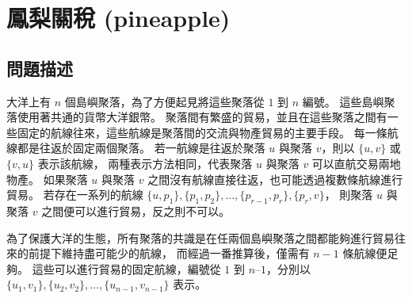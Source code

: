 \section{鳳梨關稅 (pineapple)}

\subsection{問題描述}

大洋上有 \begin{math}n\end{math} 個島嶼聚落，為了方便起見將這些聚落從
\begin{math}1\end{math} 到 \begin{math}n\end{math} 編號。
這些島嶼聚落使用著共通的貨幣大洋銀幣。
聚落間有繁盛的貿易，並且在這些聚落之間有一些固定的航線往來，這些航線是聚落間的交流與物產貿易的主要手段。
每一條航線都是往返於固定兩個聚落。 若一航線是往返於聚落
\begin{math}u\end{math} 與聚落 \begin{math}v\end{math}，則以
\begin{math}\{u, v\}\end{math} 或 \begin{math}\{v, u\}\end{math}
表示該航線， 兩種表示方法相同，代表聚落 \begin{math}u\end{math} 與聚落
\begin{math}v\end{math} 可以直航交易兩地物產。 如果聚落
\begin{math}u\end{math} 與聚落 \begin{math}v\end{math}
之間沒有航線直接往返，也可能透過複數條航線進行貿易。 若存在一系列的航線
\begin{math}\{u, p_1\}, \{p_1, p_2 \}, \ldots, \{p_{r-1}, p_r\}, \{p_r, v\}\end{math}，
則聚落 \begin{math}u\end{math} 與聚落 \begin{math}v\end{math}
之間便可以進行貿易，反之則不可以。

為了保護大洋的生態，所有聚落的共識是在任兩個島嶼聚落之間都能夠進行貿易往來的前提下維持盡可能少的航線，
而經過一番推算後，僅需有 \begin{math}n - 1\end{math} 條航線便足夠。
這些可以進行貿易的固定航線，編號從 \begin{math}1\end{math} 到
\begin{math}n – 1\end{math}，分別以
\begin{math}\{u_1, v_1\}, \{u_2,v_2\}, \ldots, \{u_{n - 1}, v_{n - 1}\}\end{math}
表示。

